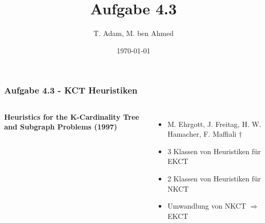 \documentclass[aspectratio=169]{beamer}
\title[Aufgabe 4.3]{Aufgabe 4.3} %
\author{T. Adam, M. ben Ahmed} %
\institute[UOS] %
{

Universität Osnabrück \\ %

\medskip
\textit{Æ} %


}
\date{\today} %
\begin{document}
\begin{frame}
\titlepage %
\end{frame}







\begin{frame}
	\frametitle{Aufgabe 4.3 - KCT Heuristiken}
	\begin{columns}[c] %
		
		\textbf{Heuristics for the K-Cardinality Tree and Subgraph Problems (1997)}
		\begin{itemize}
			\item M. Ehrgott, J. Freitag, H. W. Hamacher, F. Maffiali $\dagger$
			\item 3 Klassen von Heuristiken für EKCT
			\item 2 Klassen von Heuristiken für NKCT
			\item Umwandlung von NKCT $\Rightarrow$ EKCT
		\end{itemize}	
	\end{columns}
	\end{frame}
	
\end{document}
